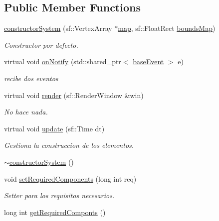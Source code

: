 \subsection*{Public Member Functions}
\begin{DoxyCompactItemize}
\item 
\hyperlink{classant_1_1constructor_system_ae6380dff3712e14585eef0f38d95c646}{constructor\+System} (sf\+::\+Vertex\+Array $\ast$\hyperlink{classant_1_1constructor_system_a4d5ae03552b88bbfdcda91608b19e036}{map}, sf\+::\+Float\+Rect \hyperlink{classant_1_1constructor_system_a72760b1f055879a614170e2a12882318}{bounds\+Map})
\begin{DoxyCompactList}\small\item\em Constructor por defecto. \end{DoxyCompactList}\item 
virtual void \hyperlink{classant_1_1constructor_system_aefb0ab92dfd17a7a374660f77434fe3a}{on\+Notify} (std\+::shared\+\_\+ptr$<$ \hyperlink{classant_1_1base_event}{base\+Event} $>$ e)
\begin{DoxyCompactList}\small\item\em recibe dos eventos \end{DoxyCompactList}\item 
virtual void \hyperlink{classant_1_1constructor_system_af35138a9176a49eb891a7ac0fedea3ba}{render} (sf\+::\+Render\+Window \&win)
\begin{DoxyCompactList}\small\item\em No hace nada. \end{DoxyCompactList}\item 
virtual void \hyperlink{classant_1_1constructor_system_a0c7631953ad4059cd52de6df967f37a0}{update} (sf\+::\+Time dt)
\begin{DoxyCompactList}\small\item\em Gestiona la construccion de los elementos. \end{DoxyCompactList}\item 
\hyperlink{classant_1_1constructor_system_abc093ea20dd5fe4107a27a3dd296d14a}{$\sim$constructor\+System} ()
\item 
void \hyperlink{classant_1_1_system_a35662ff3739ff4290df1106bfdccfaca}{set\+Required\+Components} (long int req)
\begin{DoxyCompactList}\small\item\em Setter para los requisitos necesarios. \end{DoxyCompactList}\item 
long int \hyperlink{classant_1_1_system_a2d94338969f43d4fd2fd972deb099258}{get\+Required\+Componts} ()

\end{DoxyCompactItemize}
